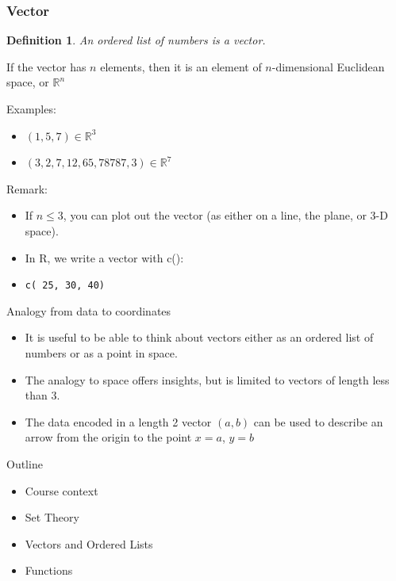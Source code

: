 \documentclass[aspectratio=169, handout]{beamer}
\newtheorem{defn}{Definition}
\numberwithin{equation}{section}
\begin{document}
\begin{frame}
\frametitle{Vector}

\begin{defn}
An ordered list of numbers is a \textit{vector}.
\end{defn}
\pause

If the vector has $n$ elements, then it is an element of $n$-dimensional Euclidean space, or $\mathbb{R}^n$ \pause

{Examples: }
\begin{itemize}
\item $(1, 5, 7)\in \mathbb{R}^3$
\item $(3, 2, 7, 12, 65, 78787, 3)\in \mathbb{R}^7$ \pause
\end{itemize}

{Remark: }
\begin{itemize}
\item If $n\leq 3$, you can plot out the vector (as either on a line, the plane, or 3-D space).
\item In R, we write a vector with c():
\item[] \texttt{c( 25, 30, 40)}
\end{itemize}

\end{frame}

\begin{frame}{Analogy from data to coordinates}

\begin{itemize}
\item It is useful to be able to think about vectors either as an ordered list of numbers or as a point in space. 
\item The analogy to space offers insights, but is limited to vectors of length less than 3.
\item The data encoded in a length 2 vector $(a, b)$ can be used to describe an arrow from the origin to the point $x = a$, $y =b$
\end{itemize}

\end{frame}


\begin{frame}{Outline}

\begin{itemize}
\item \textcolor{mygray}{Course context}
\item \textcolor{mygray}{Set Theory}
\item \textcolor{mygray}{Vectors and Ordered Lists}
\item \textcolor{myblack}{Functions}
\end{itemize}

\end{frame}
\end{document}
